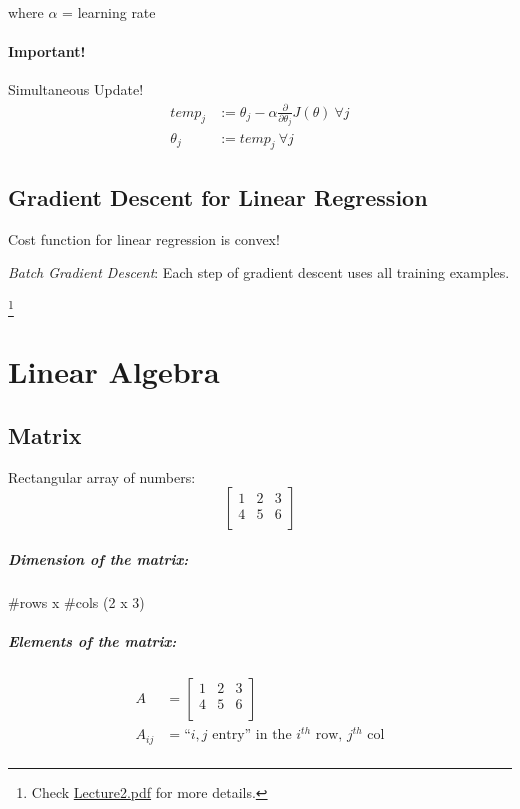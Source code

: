 \documentclass[a4paper, 12pt]{report}
\newcommand\blfootnote[1]{
	\begingroup
	\renewcommand\thefootnote{}\footnote{#1}
	\addtocounter{footnote}{-1}
	\endgroup
}
\begin{document}
where $\alpha$ = learning rate

\subsubsection*{Important!}
Simultaneous Update!
\begin{align*}
	temp_j   & := \theta_j - \alpha\frac{\partial}{\partial\theta_j}J(\theta) \ \forall j \\
	\theta_j & := temp_j \ \forall j
\end{align*}

\section{Gradient Descent for Linear Regression}
Cost function for linear regression is convex!

\emph{Batch Gradient Descent}: Each step of gradient descent uses all training examples.

\blfootnote{Check \href{lecture_pdf/Lecture2.pdf}{Lecture2.pdf} for more details.}

\chapter{Linear Algebra}
\section{Matrix}
Rectangular array of numbers:
$$
	\begin{bmatrix}
		1 & 2 & 3 \\
		4 & 5 & 6 \\
	\end{bmatrix}
$$

\paragraph*{Dimension of the matrix:} \#rows x \#cols (2 x 3)

\paragraph*{Elements of the matrix:}
\begin{align*}
	A      & =	\begin{bmatrix}
		1 & 2 & 3 \\
		4 & 5 & 6 \\
	\end{bmatrix}                                \\
	A_{ij} & = \text{``$i,j$ entry'' in the $i^{th}$ row, $j^{th}$ col} \\
\end{align*}
\end{document}

